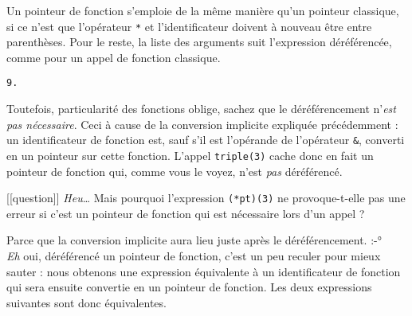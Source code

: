 \documentclass[]{article}
\newenvironment{Shaded}{}{}
\newcommand{\DataTypeTok}[1]{\textcolor[rgb]{0.56,0.13,0.00}{{#1}}}
\newcommand{\DecValTok}[1]{\textcolor[rgb]{0.25,0.63,0.44}{{#1}}}
\newcommand{\SpecialCharTok}[1]{\textcolor[rgb]{0.25,0.44,0.63}{{#1}}}
\newcommand{\StringTok}[1]{\textcolor[rgb]{0.25,0.44,0.63}{{#1}}}
\newcommand{\ImportTok}[1]{{#1}}
\newcommand{\ControlFlowTok}[1]{\textcolor[rgb]{0.00,0.44,0.13}{\textbf{{#1}}}}
\newcommand{\PreprocessorTok}[1]{\textcolor[rgb]{0.74,0.48,0.00}{{#1}}}
\newcommand{\NormalTok}[1]{{#1}}
\begin{document}
Un pointeur de fonction s'emploie de la même manière qu'un pointeur
classique, si ce n'est que l'opérateur \texttt{*} et l'identificateur
doivent à nouveau être entre parenthèses. Pour le reste, la liste des
arguments suit l'expression déréférencée, comme pour un appel de
fonction classique.

\begin{Shaded}
\end{Shaded}

\begin{verbatim}
9.
\end{verbatim}

Toutefois, particularité des fonctions oblige, sachez que le
déréférencement n'\emph{est pas nécessaire}. Ceci à cause de la
conversion implicite expliquée précédemment : un identificateur de
fonction est, sauf s'il est l'opérande de l'opérateur \texttt{\&},
converti en un pointeur sur cette fonction. L'appel \texttt{triple(3)}
cache donc en fait un pointeur de fonction qui, comme vous le voyez,
n'est \emph{pas} déréférencé.

{[}{[}question{]}{]} \textbar{} \emph{Heu}\ldots{} Mais pourquoi
l'expression \texttt{(*pt)(3)} ne provoque-t-elle pas une erreur si
c'est un pointeur de fonction qui est nécessaire lors d'un appel ?

Parce que la conversion implicite aura lieu juste après le
déréférencement. :-°\\
\emph{Eh} oui, déréférencé un pointeur de fonction, c'est un peu reculer
pour mieux sauter : nous obtenons une expression équivalente à un
identificateur de fonction qui sera ensuite convertie en un pointeur de
fonction. Les deux expressions suivantes sont donc équivalentes.
\end{document}
